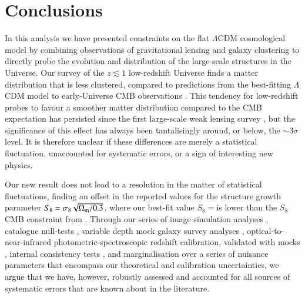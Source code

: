 \section{Conclusions}
\label{sec:conc}
In this analysis we have presented constraints on the flat $\Lambda$CDM cosmological model by combining observations of gravitational lensing and galaxy clustering to directly probe the evolution and distribution of the large-scale structures in the Universe.    Our survey of the $z \lesssim 1$ low-redshift Universe finds a matter distribution that is less clustered, compared to predictions from the best-fitting $\Lambda$CDM model to early-Universe CMB observations \citep{planck/etal:2018}.  This tendency for low-redshift probes to favour a smoother matter distribution compared to the CMB expectation has persisted since the first large-scale weak lensing survey \citep[CFHTLenS,][]{heymans/etal:2013}, but the significance of this effect has always been tantalisingly around, or below, the $\sim 3\sigma$ level.   It is therefore unclear if these differences are merely a statistical fluctuation, unaccounted for systematic errors, or a sign of interesting new physics.

Our new result does not lead to a resolution in the matter of statistical fluctuations, finding an \kpoff offset in the reported values for the structure growth parameter $S_8 = \sigma_8 \sqrt{\Omega_{\rm m}/0.3}$, where our best-fit value $S_8=$\kSeightval is \kpoffperc lower than the $S_8$ CMB constraint from \citet{planck/etal:2018}.   Through our series of image simulation analyses \citep{kannawadi/etal:2019}, catalogue null-tests \citep{giblin/etal:inprep}, variable depth mock galaxy survey analyses \citep{joachimi/etal:inprep}, optical-to-near-infrared photometric-spectroscopic redshift calibration, validated with mocks \citep{wright/etal:2020, vandenbusch/etal:2020,hildebrandt/etal:inprep}, internal consistency tests \citep{asgari/etal:inprep}, and marginalisation over a series of nuisance parameters that encompass our theoretical and calibration uncertainties,  we argue that we have, however, robustly assessed and accounted for all sources of systematic errors that are known about in the literature.    

